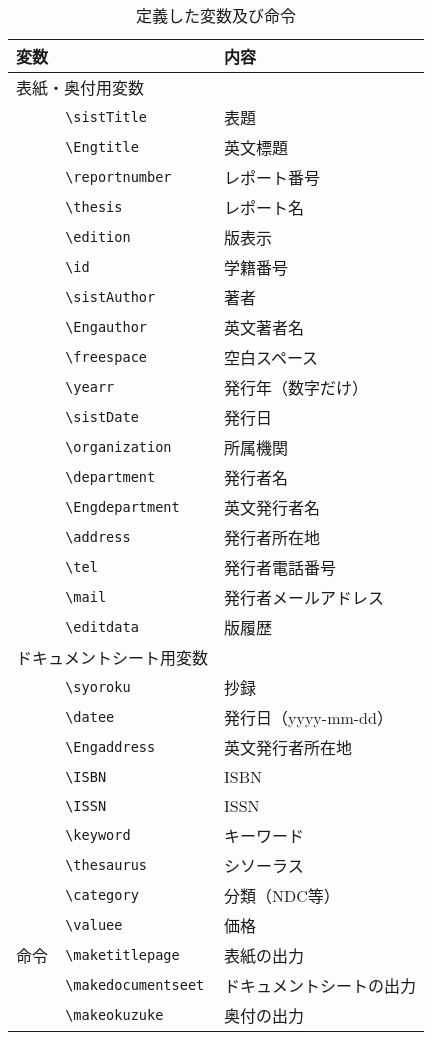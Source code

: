 ﻿\documentclass[uplatex]{jsarticle}
\renewcommand{\sistTitle}{sist09}%
\renewcommand{\Engtitle}{sist09}%
\renewcommand{\reportnumber}{}%
\renewcommand{\thesis}{パッケージ説明文書}%
\renewcommand{\edition}{(v1.0.0)}%
\renewcommand{\id}{}%
\renewcommand{\sistAuthor}{渡邉　充哉}%
\renewcommand{\Engauthor}{WATANABE Atsuya}%
\renewcommand{\freespace}{}
\renewcommand{\yearr}{2021}%
\renewcommand{\sistDate}{\today}%
\renewcommand{\organization}{~}
\renewcommand{\department}{~}%
\renewcommand{\Engdepartment}{}%
\renewcommand{\address}{}%
\renewcommand{\tel}{}%
\renewcommand{\mail}{}
\renewcommand{\editdata}{\sistDate}%
\begin{document}
\begin{table*}
\centering
\caption{定義した変数及び命令\label{tbl:variable}}
\begin{tabular}{lll}
\toprule
\multicolumn{2}{l}{変数}				&	内容\\
\midrule
\multicolumn{2}{l}{表紙・奥付用変数}\\
&\verb|\sistTitle|		&	表題\\
&\verb|\Engtitle|	&	英文標題\\
&\verb|\reportnumber|	&	レポート番号\\
&\verb|\thesis|		&	レポート名\\
&\verb|\edition|		&	版表示\\
&\verb|\id|			&	学籍番号\\
&\verb|\sistAuthor|		&	著者\\
&\verb|\Engauthor|	&	英文著者名\\
&\verb|\freespace|	&	空白スペース\\
&\verb|\yearr|		&	発行年（数字だけ）\\
&\verb|\sistDate|		&	発行日\\
&\verb|\organization|&	所属機関\\
&\verb|\department|	&	発行者名\\
&\verb|\Engdepartment|&	英文発行者名\\
&\verb|\address|		&	発行者所在地\\
&\verb|\tel|			&	発行者電話番号\\
&\verb|\mail|		&	発行者メールアドレス\\
&\verb|\editdata|	&	版履歴\\
\multicolumn{2}{l}{ドキュメントシート用変数}\\
&\verb|\syoroku|		&	抄録\\
&\verb|\datee|		&	発行日（yyyy-mm-dd）\\
&\verb|\Engaddress|	&	英文発行者所在地\\
&\verb|\ISBN|		&	ISBN\\
&\verb|\ISSN|		&	ISSN\\
&\verb|\keyword|		&	キーワード\\
&\verb|\thesaurus|	&	シソーラス\\
&\verb|\category|	&	分類（NDC等）\\
&\verb|\valuee|		&	価格\\
命令
&\verb|\maketitlepage|		&	表紙の出力\\
&\verb|\makedocumentseet|	&	ドキュメントシートの出力\\
&\verb|\makeokuzuke|		&	奥付の出力\\
\bottomrule
\end{tabular}
\end{table*}
\end{document}

